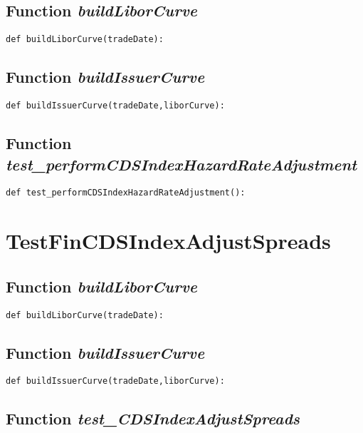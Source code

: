 \documentclass[twoside,11pt]{book}
\begin{document}
\subsection{Function {\it buildLiborCurve}}


\begin{lstlisting}
def buildLiborCurve(tradeDate):
\end{lstlisting}

\subsection{Function {\it buildIssuerCurve}}


\begin{lstlisting}
def buildIssuerCurve(tradeDate,liborCurve):
\end{lstlisting}

\subsection{Function {\it test\_performCDSIndexHazardRateAdjustment}}


\begin{lstlisting}
def test_performCDSIndexHazardRateAdjustment():
\end{lstlisting}


\newpage
\section{TestFinCDSIndexAdjustSpreads}

\subsection{Function {\it buildLiborCurve}}


\begin{lstlisting}
def buildLiborCurve(tradeDate):
\end{lstlisting}

\subsection{Function {\it buildIssuerCurve}}


\begin{lstlisting}
def buildIssuerCurve(tradeDate,liborCurve):
\end{lstlisting}

\subsection{Function {\it test\_CDSIndexAdjustSpreads}}
\end{document}
